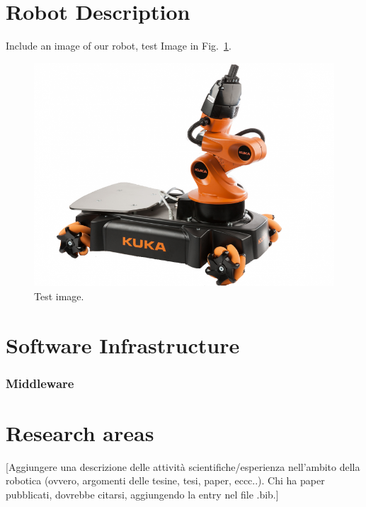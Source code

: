 \documentclass[conference]{IEEEtran}
\begin{document}
\section{Robot Description}
Include an image of our robot, test Image in Fig.~\ref{fig:test_img}.\\
\begin{figure}[t!]
\begin{center}
\includegraphics[angle=0,width=\linewidth]{images/test_img.png}
\end{center}
\caption{Test image.}\label{fig:test_img}
\end{figure}

\section{Software Infrastructure}
\subsubsection{Middleware}

\section{Research areas}

[Aggiungere una descrizione delle attività scientifiche/esperienza nell'ambito della robotica (ovvero, argomenti delle tesine, tesi, paper, eccc..). Chi ha paper pubblicati, dovrebbe citarsi, aggiungendo la entry nel file .bib.]
\end{document}
